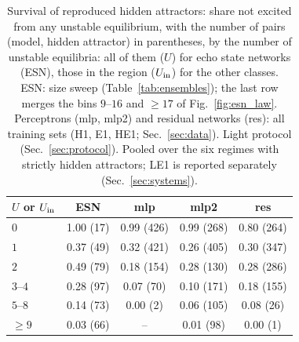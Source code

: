 \begin{table}
\caption{Survival of reproduced hidden attractors: share not excited from any unstable equilibrium, with the number of
pairs (model, hidden attractor) in parentheses, by the number of unstable equilibria: all of them ($U$) for echo state
networks (ESN), those in the region ($U_{\mathrm{in}}$) for the other classes. ESN: size sweep (Table~\ref{tab:ensembles}); the last
row merges the bins $9$--$16$ and $\ge17$ of Fig.~\ref{fig:esn_law}. Perceptrons (mlp, mlp2) and residual networks (res):
all training sets (H1, E1, HE1; Sec.~\ref{sec:data}). Light protocol (Sec.~\ref{sec:protocol}). Pooled over the six regimes
with strictly hidden attractors; LE1 is reported separately (Sec.~\ref{sec:systems}).}
\label{tab:classes}
\begin{ruledtabular}
\begin{tabular}{lcccc}
$U$ or $U_{\mathrm{in}}$ & ESN & mlp & mlp2 & res \\
\hline
$0$ & 1.00 (17) & 0.99 (426) & 0.99 (268) & 0.80 (264) \\
$1$ & 0.37 (49) & 0.32 (421) & 0.26 (405) & 0.30 (347) \\
$2$ & 0.49 (79) & 0.18 (154) & 0.28 (130) & 0.28 (286) \\
$3$--$4$ & 0.28 (97) & 0.07 (70) & 0.10 (171) & 0.18 (155) \\
$5$--$8$ & 0.14 (73) & 0.00 (2) & 0.06 (105) & 0.08 (26) \\
$\ge9$ & 0.03 (66) & -- & 0.01 (98) & 0.00 (1) \\
\end{tabular}
\end{ruledtabular}
\end{table}
